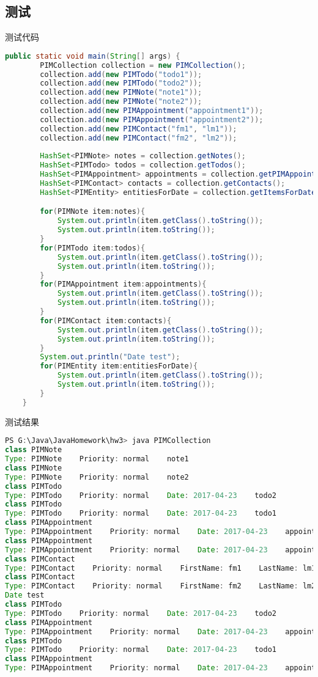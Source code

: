 \documentclass[a4paper]{article}
\begin{document}
\subsection{测试}
测试代码
\begin{lstlisting}[language=Java]
    public static void main(String[] args) {
        PIMCollection collection = new PIMCollection();
        collection.add(new PIMTodo("todo1"));
        collection.add(new PIMTodo("todo2"));
        collection.add(new PIMNote("note1"));
        collection.add(new PIMNote("note2"));
        collection.add(new PIMAppointment("appointment1"));
        collection.add(new PIMAppointment("appointment2"));
        collection.add(new PIMContact("fm1", "lm1"));
        collection.add(new PIMContact("fm2", "lm2"));
        
        HashSet<PIMNote> notes = collection.getNotes();
        HashSet<PIMTodo> todos = collection.getTodos();
        HashSet<PIMAppointment> appointments = collection.getPIMAppointments();
        HashSet<PIMContact> contacts = collection.getContacts();
        HashSet<PIMEntity> entitiesForDate = collection.getItemsForDate(LocalDate.now());

        for(PIMNote item:notes){
            System.out.println(item.getClass().toString());
            System.out.println(item.toString());
        }
        for(PIMTodo item:todos){
            System.out.println(item.getClass().toString());
            System.out.println(item.toString());
        }
        for(PIMAppointment item:appointments){
            System.out.println(item.getClass().toString());
            System.out.println(item.toString());
        }
        for(PIMContact item:contacts){
            System.out.println(item.getClass().toString());
            System.out.println(item.toString());
        }
        System.out.println("Date test");
        for(PIMEntity item:entitiesForDate){
            System.out.println(item.getClass().toString());
            System.out.println(item.toString());
        }
    }
\end{lstlisting}

测试结果
\begin{lstlisting}[language=Java,numbers=none]
PS G:\Java\JavaHomework\hw3> java PIMCollection
class PIMNote
Type: PIMNote    Priority: normal    note1
class PIMNote
Type: PIMNote    Priority: normal    note2
class PIMTodo
Type: PIMTodo    Priority: normal    Date: 2017-04-23    todo2
class PIMTodo
Type: PIMTodo    Priority: normal    Date: 2017-04-23    todo1
class PIMAppointment
Type: PIMAppointment    Priority: normal    Date: 2017-04-23    appointment1
class PIMAppointment
Type: PIMAppointment    Priority: normal    Date: 2017-04-23    appointment2
class PIMContact
Type: PIMContact    Priority: normal    FirstName: fm1    LastName: lm1    EmailAddress:
class PIMContact
Type: PIMContact    Priority: normal    FirstName: fm2    LastName: lm2    EmailAddress:
Date test
class PIMTodo
Type: PIMTodo    Priority: normal    Date: 2017-04-23    todo2
class PIMAppointment
Type: PIMAppointment    Priority: normal    Date: 2017-04-23    appointment1
class PIMTodo
Type: PIMTodo    Priority: normal    Date: 2017-04-23    todo1
class PIMAppointment
Type: PIMAppointment    Priority: normal    Date: 2017-04-23    appointment2
\end{lstlisting}
\end{document}

